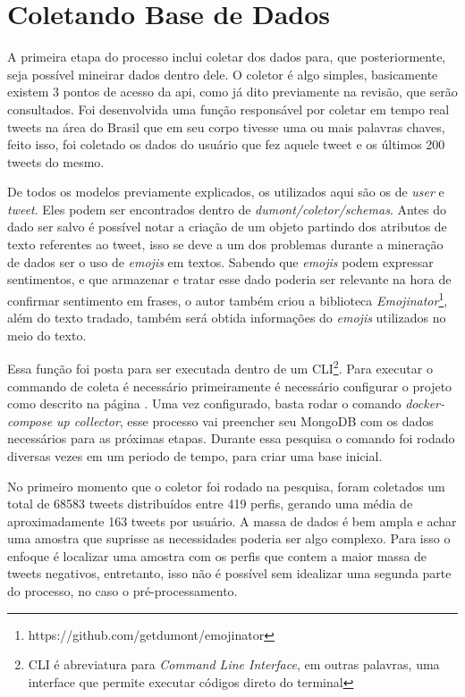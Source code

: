 \section{Coletando Base de Dados}
A primeira etapa do processo inclui coletar dos dados para, que posteriormente, seja possível mineirar dados dentro dele. O coletor é algo simples, basicamente existem 3 pontos de acesso da api, como já dito previamente na revisão, que serão consultados. Foi desenvolvida uma função responsável por coletar em tempo real tweets na área do Brasil que em seu corpo tivesse uma ou mais palavras chaves, feito isso, foi coletado os dados do usuário que fez aquele tweet e os últimos 200 tweets do mesmo.

De todos os modelos previamente explicados, os utilizados aqui são os de \textit{user} e \textit{tweet}. Eles podem ser encontrados dentro de \textit{dumont/coletor/schemas}. Antes do dado ser salvo é possível notar a criação de um objeto partindo dos atributos de texto referentes ao tweet, isso se deve a um dos problemas durante a mineração de dados ser o uso de \textit{emojis} em textos. Sabendo que \textit{emojis} podem expressar sentimentos, e que armazenar e tratar esse dado poderia ser relevante na hora de confirmar sentimento em frases, o autor também criou a biblioteca \textit{Emojinator}\footnote{https://github.com/getdumont/emojinator}, além do texto tradado, também será obtida informações do \textit{emojis} utilizados no meio do texto.

Essa função foi posta para ser executada dentro de um CLI\footnote{CLI é abreviatura para \textit{Command Line Interface}, em outras palavras, uma interface que permite executar códigos direto do terminal}. Para executar o commando de coleta é necessário primeiramente é necessário configurar o projeto como descrito na página \pageref{app:configuracoes}. Uma vez configurado, basta rodar o comando \textit{docker-compose up collector}, esse processo vai preencher seu MongoDB com os dados necessários para as próximas etapas. Durante essa pesquisa o comando foi rodado diversas vezes em um periodo de tempo, para criar uma base inicial.

No primeiro momento que o coletor foi rodado na pesquisa, foram coletados um total de 68583 tweets distribuídos entre 419 perfis, gerando uma média de aproximadamente 163 tweets por usuário. A massa de dados é bem ampla e achar uma amostra que suprisse as necessidades poderia ser algo complexo. Para isso o enfoque é localizar uma amostra com os perfis que contem a maior massa de tweets negativos, entretanto, isso não é possível sem idealizar uma segunda parte do processo, no caso o pré-processamento.
